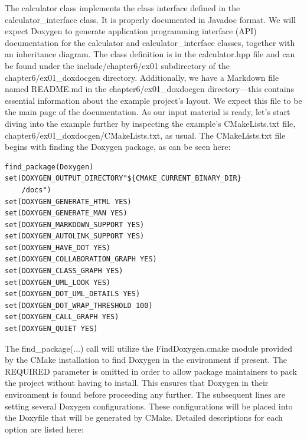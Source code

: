 The calculator class implements the class interface defined in the calculator\_interface class. It is properly documented in Javadoc format. We will expect Doxygen to generate application programming interface (API) documentation for the calculator and calculator\_interface classes, together with an inheritance diagram. The class definition is in the calculator.hpp file and can be found under the include/chapter6/ex01 subdirectory of the chapter6/ex01\_doxdocgen directory. Additionally, we have a Markdown file named README.md in the chapter6/ex01\_doxdocgen directory—this contains essential information about the example project's layout. We expect this file to be the main page of the documentation. As our input material is ready, let's start diving into the example further by inspecting the example's CMakeLists.txt file, chapter6/ex01\_doxdocgen/CMakeLists.txt, as usual. The CMakeLists.txt file begins with finding the Doxygen package, as can be seen here:

\begin{lstlisting}[style=styleCMake]
find_package(Doxygen)
set(DOXYGEN_OUTPUT_DIRECTORY"${CMAKE_CURRENT_BINARY_DIR}
	/docs")
set(DOXYGEN_GENERATE_HTML YES)
set(DOXYGEN_GENERATE_MAN YES)
set(DOXYGEN_MARKDOWN_SUPPORT YES)
set(DOXYGEN_AUTOLINK_SUPPORT YES)
set(DOXYGEN_HAVE_DOT YES)
set(DOXYGEN_COLLABORATION_GRAPH YES)
set(DOXYGEN_CLASS_GRAPH YES)
set(DOXYGEN_UML_LOOK YES)
set(DOXYGEN_DOT_UML_DETAILS YES)
set(DOXYGEN_DOT_WRAP_THRESHOLD 100)
set(DOXYGEN_CALL_GRAPH YES)
set(DOXYGEN_QUIET YES)
\end{lstlisting}

The find\_package(...) call will utilize the FindDoxygen.cmake module provided by the CMake installation to find Doxygen in the environment if present. The REQUIRED parameter is omitted in order to allow package maintainers to pack the project without having to install. This ensures that Doxygen in their environment is found before proceeding any further. The subsequent lines are setting several Doxygen configurations. These configurations will be placed into the Doxyfile that will be generated by CMake. Detailed descriptions for each option are listed here:

